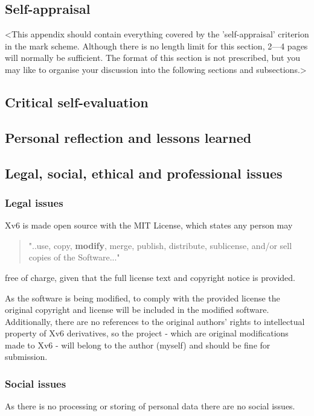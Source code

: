 \begin{appendices}

%
%
\chapter{Self-appraisal}

<This appendix should contain everything covered by the 'self-appraisal' criterion in the mark scheme. Although there is no length limit for this section, 2---4 pages will normally be sufficient. The format of this section is not prescribed, but you may like to organise your discussion into the following sections and subsections.>

\section{Critical self-evaluation}

\section{Personal reflection and lessons learned}

\section{Legal, social, ethical and professional issues}


\subsection{Legal issues}
Xv6 is made open source with the MIT License, which states any person may
\begin{quote}
    "..use, copy, \textbf{modify}, merge, publish,
    distribute, sublicense, and/or sell copies of the Software..."
\end{quote}
free of charge, given that the full license text and copyright notice
is provided.

As the software is being modified, to comply with the provided license the
original copyright and license will be included in the modified software.
Additionally, there are no references to the original authors' rights to intellectual
property of Xv6 derivatives, so the project - which are original modifications
made to Xv6 - will belong to the author (myself) and should be fine for submission.
\subsection{Social issues}
As there is no processing or storing of personal data there are no social issues.

\end{appendices}
